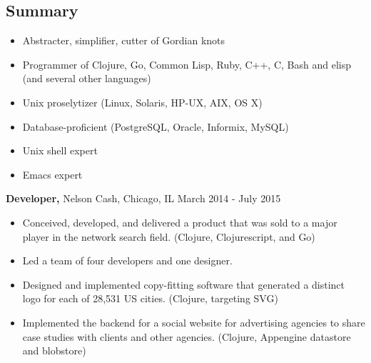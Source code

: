 \documentclass[margin]{res}
\begin{document}
 
 
 
\address{{\bf Home Address} \\ 2446 North Albany Avenue \\ Chicago, IL 60647-2602  \\
        (773) 349-2020 }
\address{{\bf Email Address} \\ me@clojure.us }

 
\begin{resume} 
 
\section{Summary} 
\begin{itemize} \itemsep -2pt %
\item Abstracter, simplifier, cutter of Gordian knots
\item Programmer of Clojure, Go, Common Lisp, Ruby, C++, C, Bash and elisp (and several other languages)
\item Unix proselytizer (Linux, Solaris, HP-UX, AIX, OS X)
\item Database-proficient (PostgreSQL, Oracle, Informix, MySQL)
\item Unix shell expert
\item Emacs expert
\end{itemize}

 {\bf Developer,} Nelson Cash, Chicago, IL \hfill March 2014 - July 2015
\begin{itemize} \itemsep -2pt %
\item Conceived, developed, and delivered a product that was sold to a major player in the network search field. (Clojure, Clojurescript, and Go)
\item Led a team of four developers and one designer.
\item Designed and implemented copy-fitting software that generated a distinct logo for each of 28,531 US cities. (Clojure, targeting SVG)
\item Implemented the backend for a social website for advertising agencies to share case studies with clients and other agencies.  (Clojure, Appengine datastore and blobstore)
\end{itemize}


\end{resume}
\end{document}
